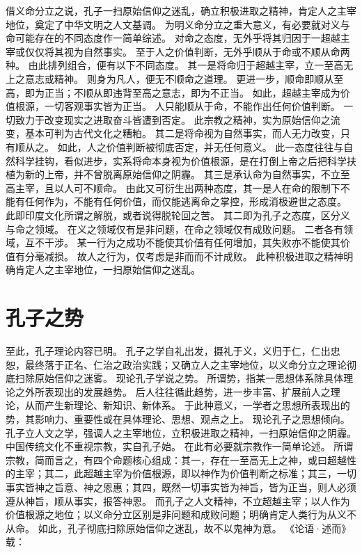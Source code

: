 \documentclass[11pt]{article}
\begin{document}
借义命分立之说，孔子一扫原始信仰之迷乱，确立积极进取之精神，肯定人之主宰地位，奠定了中华文明之人文基调。
为明义命分立之重大意义，有必要就对义与命可能存在的不同态度作一简单综述。
对命之态度，无外乎将其归因于一超越主宰或仅仅将其视为自然事实。
至于人之价值判断，无外乎顺从于命或不顺从命两种。
由此排列组合，便有以下不同态度。
其一是将命归于超越主宰，立一至高无上之意志或精神。
则身为凡人，便无不顺命之道理。
更进一步，顺命即顺从至高，即为正当；不顺从即违背至高之意志，即为不正当。
如此，超越主宰成为价值根源，一切客观事实皆为正当。
人只能顺从于命，不能作出任何价值判断。
一切致力于改变现实之进取奋斗皆遭到否定。
此宗教之精神，实为原始信仰之流变，基本可判为古代文化之糟粕。
其二是将命视为自然事实，而人无力改变，只有顺从之。
如此，人之价值判断被彻底否定，并无任何意义。
此一态度往往与自然科学挂钩，看似进步，实系将命本身视为价值根源，是在打倒上帝之后把科学扶植为新的上帝，并不曾脱离原始信仰之阴霾。
其三是承认命为自然事实，不立至高主宰，且以人可不顺命。
由此又可衍生出两种态度，其一是人在命的限制下不能有任何作为，不能有任何价值，而仅能逃离命之掌控，形成消极避世之态度。
此即印度文化所谓之解脱，或者说得脱轮回之苦。
其二即为孔子之态度，区分义与命之领域。
在义之领域仅有是非问题，在命之领域仅有成败问题。
二者各有领域，互不干涉。
某一行为之成功不能使其价值有任何增加，其失败亦不能使其价值有分毫减损。
故人之行为，仅考虑是非而而不计成败。
此种积极进取之精神明确肯定人之主宰地位，一扫原始信仰之迷乱。

\section{孔子之势}
至此，孔子理论内容已明。
孔子之学自礼出发，摄礼于义，义归于仁，仁出忠恕，最终落于正名、仁治之政治实践；又确立人之主宰地位，以义命分立之理论彻底扫除原始信仰之迷雾。
现论孔子学说之势。
所谓势，指某一思想体系除具体理论之外所表现出的发展趋势。
后人往往循此趋势，进一步丰富、扩展前人之理论，从而产生新理论、新知识、新体系。
于此种意义，一学者之思想所表现出的势，其影响力、重要性或在具体理论、思想、观点之上。
现论孔子之思想倾向。
\newline
孔子立人文之学，强调人之主宰地位，立积极进取之精神，一扫原始信仰之阴霾。
中国传统文化不重视宗教，实自孔子始。
在此有必要就宗教作一简单论述。
所谓宗教，简而言之，有四个命题核心组成：其一，存在一至高无上之神，或曰超越性的主宰；其二，此超越主宰为价值根源，即以神作为价值判断之标准；其三，一切事实皆神之旨意、神之恩惠；其四，既然一切事实皆为神旨，皆为正当，则人必须遵从神旨，顺从事实，报答神恩。
而孔子之人文精神，不立超越主宰；以人作为价值根源之地位；以义命分立区别是非问题和成败问题；明确肯定人类行为从义不从命。
如此，孔子彻底扫除原始信仰之迷乱，故不以鬼神为意。
《论语·述而》载：
\end{document}
